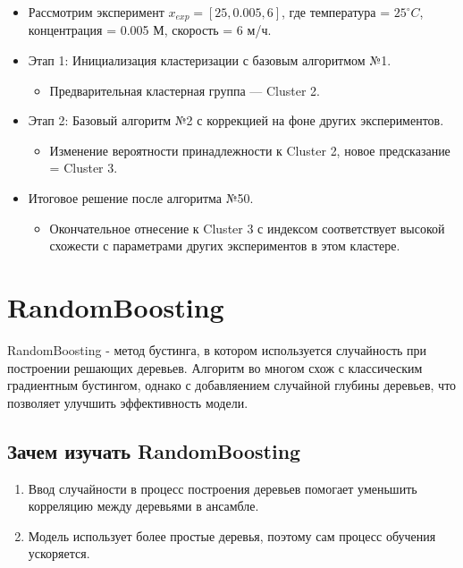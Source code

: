 \begin{itemize}
    \item Рассмотрим эксперимент $x_{exp} = [25, 0.005, 6]$, где температура = $25^\circ C$, концентрация = 0.005 М, скорость = 6 м/ч.
    \item Этап 1: Инициализация кластеризации с базовым алгоритмом №1.
        \begin{itemize}
            \item Предварительная кластерная группа — Cluster 2.
        \end{itemize}
    \item Этап 2: Базовый алгоритм №2 с коррекцией на фоне других экспериментов.
        \begin{itemize}
            \item Изменение вероятности принадлежности к Cluster 2, новое предсказание = Cluster 3.
        \end{itemize}
    \item Итоговое решение после алгоритма №50.
        \begin{itemize}
            \item Окончательное отнесение к Cluster 3 с индексом соответствует высокой схожести с параметрами других экспериментов в этом кластере.
        \end{itemize}
\end{itemize}


\section*{RandomBoosting}

RandomBoosting - метод бустинга, в котором используется случайность при построении решающих деревьев. Алгоритм во многом схож с классическим градиентным бустингом, однако с добавляением случайной глубины деревьев, что позволяет улучшить эффективность модели.

\subsection*{Зачем изучать RandomBoosting}
\begin{enumerate}
    \item {} Ввод случайности в процесс построения деревьев помогает уменьшить корреляцию между деревьями в ансамбле.
    \item {} Модель использует более простые деревья, поэтому сам процесс обучения ускоряется. 
\end{enumerate}

